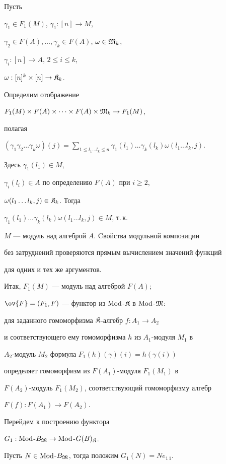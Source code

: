 \begin{pf}
Пусть


$\gamma_1\in F_1(M)$, $\gamma_1:[n]\to M$,


$\gamma_2\in F(A),\dotsc,\gamma_k\in F(A)$, $\omega\in \frak M_k$,


$\gamma_i:[n]\to A$, $2\le i\le k$,


$\omega:[n]^k\times [n]\to \frak K_k$.


Определим отображение


$F_1(M)\times F(A)\times \dotsb \times F(A)\times \frak M_k\to F_1(M)$,


полагая


$(\gamma_1\gamma_2\dotsc \gamma_k\omega)(j)=


\sum\limits_{1\le l_1 \dots l_k \le n}


\gamma_1(l_1)\dotsc \gamma_k(l_k)\omega(l_1\dotsc l_k,j)$.


Здесь $\gamma_1(l_1)\in M$,


$\gamma_i(l_i)\in A$ по определению $F(A)$ при $i\ge 2$,


$\omega(l_1\dotsc l_k,j)\in \frak K_k$. Тогда


$\gamma_1(l_1)\dotsc \gamma_k(l_k)\omega(l_1\dotsc l_k,j)\in M$, т.\,к.


$M$ --- модуль над алгеброй $A$. Cвойства модульной композиции


без затруднений проверяются прямым вычислением значений функций


для одних и тех же аргументов.


Итак, $F_1(M)$ --- модуль над алгеброй $F(A)$;


$\ov{F}=(F_1,F)$ --- функтор из $\operatorname{Mod}$-$\frak K$ в $\operatorname{Mod}$-${\frak M}$:


для заданного гомоморфизма $\frak K$-алгебр $f:A_1\to A_2$


и соответствующего ему гомоморфизма $h$ из $A_1$-модуля $M_1$ в


$A_2$-модуль $M_2$ формула $F_1(h)(\gamma)(i)=h(\gamma(i))$


определяет гомоморфизм из $F(A_1)$-модуля $F_1(M_1)$ в


$F(A_2)$-модуль $F_1(M_2)$, соответствующий гомоморфизму алгебр


$F(f):F(A_1)\to F(A_2)$.





Перейдем к построению функтора


$G_1:\operatorname{Mod}$-$B_{\frak M}\to \operatorname{Mod}$-$G(B)_{\frak K}$.


Пусть $N\in \operatorname{Mod}$-$B_{\frak M}$, тогда положим $G_1(N)=Ne_{1\,1}$.



\end{pf}
